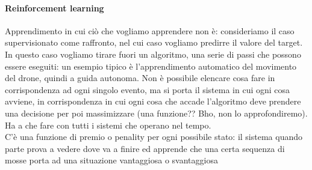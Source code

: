 \documentclass[12pt, oneside]{extbook}
\begin{document}
\paragraph{Reinforcement learning}
Apprendimento in cui ciò che vogliamo apprendere non è: consideriamo il caso supervisionato come raffronto, nel cui caso vogliamo predirre il valore del target.\\In questo caso vogliamo tirare fuori un algoritmo, una serie di passi che possono essere eseguiti: un esempio tipico è l'apprendimento automatico del movimento del drone, quindi a guida autonoma. Non è possibile elencare cosa fare in corrispondenza ad ogni singolo evento, ma si porta il sistema in cui ogni cosa avviene, in corrispondenza in cui ogni cosa che accade l'algoritmo deve prendere una decisione per poi massimizzare (una funzione?? Bho, non lo approfondiremo).\\Ha a che fare con tutti i sistemi che operano nel tempo.\\C'è una funzione di premio o penality per ogni possibile stato: il sistema quando parte prova a vedere dove va a finire ed apprende che una certa sequenza di mosse porta ad una situazione vantaggiosa o svantaggiosa\\\\
\end{document}
